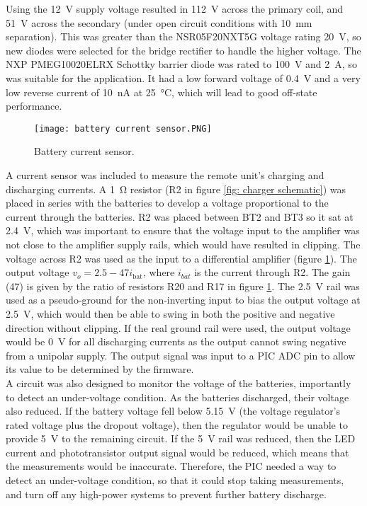 Using the \SI{12}{\volt} supply voltage resulted in \SI{112}{\volt} across the primary coil, and \SI{51}{\volt} across the secondary (under open circuit conditions with \SI{10}{\milli\metre} separation). This was greater than the NSR05F20NXT5G voltage rating \SI{20}{\volt}, so new diodes were selected for the bridge rectifier to handle the higher voltage. The NXP PMEG10020ELRX Schottky barrier diode \cite{new_diode} was rated to \SI{100}{\volt} and \SI{2}{\ampere}, so was suitable for the application. It had a low forward voltage of \SI{0.4}{\volt} and a very low reverse current of \SI{10}{\nano\ampere} at \SI{25}{\celsius}, which will lead to good off-state performance.\\




\begin{figure}[htbp]
	\centering
	\texttt{[image: battery current sensor.PNG]}
	\caption{Battery current sensor.}
	\label{fig: battery current sensor}
\end{figure}

A current sensor was included to measure the remote unit's charging and discharging currents. A \SI{1}{\ohm} resistor (R2 in figure \ref{fig: charger schematic}) was placed in series with the batteries to develop a voltage proportional to the current through the batteries. R2 was placed between BT2 and BT3 so it sat at \SI{2.4}{\volt}, which was important to ensure that the voltage input to the amplifier was not close to the amplifier supply rails, which would have resulted in clipping. The voltage across R2 was used as the input to a differential amplifier (figure \ref{fig: battery current sensor}). The output voltage $v_o = 2.5 - 47 i_\text{bat}$, where $i_{bat}$ is the current through R2. The gain (47) is given by the ratio of resistors R20 and R17 in figure \ref{fig: battery current sensor}. The \SI{2.5}{\volt} rail was used as a pseudo-ground for the non-inverting input to bias the output voltage at \SI{2.5}{\volt}, which would then be able to swing in both the positive and negative direction without clipping. If the real ground rail were used, the output voltage would be \SI{0}{\volt} for all discharging currents as the output cannot swing negative from a unipolar supply. The output signal was input to a PIC ADC pin to allow its value to be determined by the firmware.\\



A circuit was also designed to monitor the voltage of the batteries, importantly to detect an under-voltage condition. As the batteries discharged, their voltage also reduced. If the battery voltage fell below \SI{5.15}{\volt} (the voltage regulator's rated voltage plus the dropout voltage), then the regulator would be unable to provide \SI{5}{\volt} to the remaining circuit. If the \SI{5}{\volt} rail was reduced, then the LED current and phototransistor output signal would be reduced, which means that the measurements would be inaccurate. Therefore, the PIC needed a way to detect an under-voltage condition, so that it could stop taking measurements, and turn off any high-power systems to prevent further battery discharge.\\

